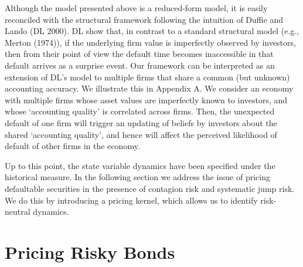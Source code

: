 \documentclass[titlepage,11pt]{article}
\begin{document}
Although the model presented above is a reduced-form model, it is
easily reconciled with the structural framework following the
intuition of Duffie and Lando (DL 2000). DL show that, in contrast
to a standard structural model (e.g., Merton (1974)), if the
underlying firm value is imperfectly observed by investors, then
from their point of view the default time becomes inaccessible in
that default arrives as a surprise event. Our framework can be
interpreted as an extension of DL's model to multiple firms that
share a common (but unknown) accounting accuracy. We illustrate this
in Appendix A. We consider an economy with multiple firms whose
asset values are imperfectly known to investors, and whose
`accounting quality' is correlated across firms.  Then, the
unexpected default of one firm will trigger an updating of beliefs
by investors about the shared `accounting quality', and hence will
affect the perceived likelihood of default of other firms in the
economy.

Up to this point, the state variable dynamics have been specified
under the historical measure. In the following section we address
the issue of pricing defaultable securities in the presence of
contagion risk and systematic jump risk.  We do this by introducing
a pricing kernel, which allows us to identify risk-neutral dynamics.


\newcommand{\hg}{{\widehat \gamma}}
\newcommand{\HG}{{\widehat \Gamma}}
\newcommand{\lkj}{\lambda\sub{kj}}
\newcommand{\J}{{\cal J}}

\section{Pricing Risky Bonds}
\end{document}
